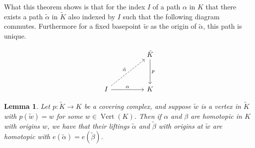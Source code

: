 \documentclass[12pt]{article}
\newtheorem{lemma}{Lemma}
\theoremstyle{definition}
\numberwithin{equation}{theorem}
\begin{document}
What this theorem shows is that for the index $I$ of a path $\alpha$ in $K$ that there exists a path $\tilde{\alpha}$ in $\tilde{K}$ also indexed by $I$ such that the following diagram commutes. Furthermore for a fixed basepoint $\tilde{w}$ as the origin of $\tilde{\alpha}$, this path is unique.


\begin{equation*}
    \begin{tikzcd}[ampersand replacement=\&, sep=huge]
      \& \tilde{K} \arrow[d,"p"] \\
    I \arrow[ur,dashrightarrow,"\tilde{\alpha}"] \arrow[r,"\alpha"] \& K
  \end{tikzcd}
\end{equation*}

\begin{lemma}
  \label{lem:lift-homo}
  Let $p:\tilde{K} \rightarrow K$ be a covering complex, and suppose $\tilde{w}$ is a vertex in $\tilde{K}$ with $p(\tilde{w}) = w $ for some $w \in \operatorname{Vert}(K)$. Then if $\alpha$ and $\beta$ are homotopic in $K$ with origins $w$, we have that their liftings $\tilde{\alpha}$ and $\tilde{\beta}$ with origins at $\tilde{w}$ are homotopic with $e(\tilde{\alpha}) = e(\tilde{\beta})$.
\end{lemma}
\end{document}
